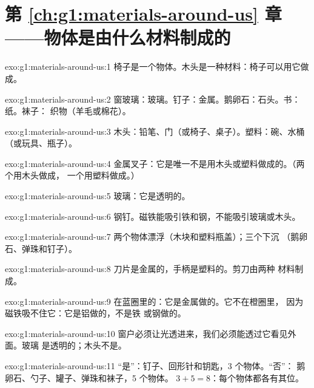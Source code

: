 \section*{第 \ref{ch:g1:materials-around-us} 章——物体是由什么材料制成的}

\begin{solution}{exo:g1:materials-around-us:1}
椅子是一个物体。木头是一种材料：椅子可以用它做成。
\end{solution}

\begin{solution}{exo:g1:materials-around-us:2}
窗玻璃：玻璃。钉子：金属。鹅卵石：石头。书：纸。袜子：
织物（羊毛或棉花）。
\end{solution}

\begin{solution}{exo:g1:materials-around-us:3}
木头：铅笔、门（或椅子、桌子）。塑料：碗、水桶
（或玩具、瓶子）。
\end{solution}

\begin{solution}{exo:g1:materials-around-us:4}
金属叉子：它是唯一不是用木头或塑料做成的。（两个用木头做成，
一个用塑料做成。）
\end{solution}

\begin{solution}{exo:g1:materials-around-us:5}
玻璃：它是透明的。
\end{solution}

\begin{solution}{exo:g1:materials-around-us:6}
钢钉。磁铁能吸引铁和钢，不能吸引玻璃或木头。
\end{solution}

\begin{solution}{exo:g1:materials-around-us:7}
两个物体漂浮（木块和塑料瓶盖）；三个下沉
（鹅卵石、弹珠和钉子）。
\end{solution}

\begin{solution}{exo:g1:materials-around-us:8}
刀片是金属的，手柄是塑料的。剪刀由两种
材料制成。
\end{solution}

\begin{solution}{exo:g1:materials-around-us:9}
在蓝圈里的：它是金属做的。它不在橙圈里，
因为磁铁吸不住它：它是铝做的，不是铁
或钢做的。
\end{solution}

\begin{solution}{exo:g1:materials-around-us:10}
窗户必须让光透进来，我们必须能透过它看见外面。玻璃
是透明的；木头不是。
\end{solution}

\begin{solution}{exo:g1:materials-around-us:11}
“是”：钉子、回形针和钥匙，3 个物体。“否”：
鹅卵石、勺子、罐子、弹珠和袜子，5 个物体。
$3 + 5 = 8$：每个物体都各有其位。
\end{solution}
